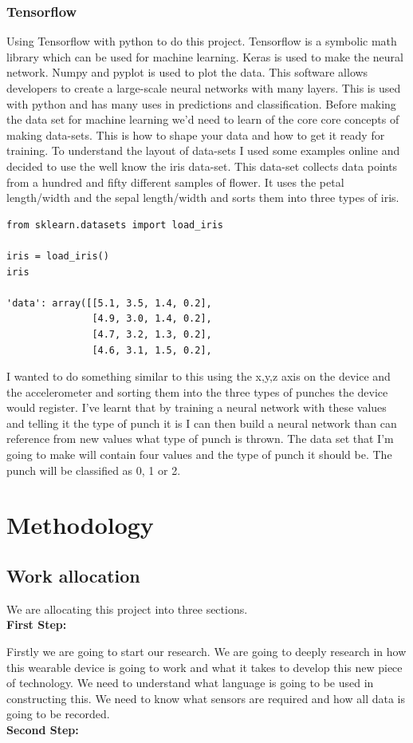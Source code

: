 \documentclass[a4paper,12pt,twoside]{report}
\begin{document}
\subsection{Tensorflow}
Using Tensorflow with python to do this project. Tensorflow is a symbolic math library which can be used for machine learning. Keras is used to make the neural network. Numpy and pyplot is used to plot the data. This software allows developers to create a large-scale neural networks with many layers. This is used with python and has many uses in predictions and classification. Before making the data set for machine learning we'd need to learn of the core core concepts of making data-sets. This is how to shape your data and how to get it ready for training. To understand the layout of data-sets I used some examples online and decided to use the well know the iris data-set. This data-set collects data points from a hundred and fifty different samples of flower. It uses the petal length/width and the sepal length/width and sorts them into three types of iris.
\begin{verbatim}
from sklearn.datasets import load_iris

iris = load_iris()
iris

'data': array([[5.1, 3.5, 1.4, 0.2],
               [4.9, 3.0, 1.4, 0.2],
               [4.7, 3.2, 1.3, 0.2],
               [4.6, 3.1, 1.5, 0.2],
\end{verbatim}
I wanted to do something similar to this using the x,y,z axis on the device and the accelerometer and sorting them into the three types of punches the device would register. I've learnt that by training a neural network with these values and telling it the type of punch it is I can then build a neural network than can reference from new values what type of punch is thrown. The data set that I'm going to make will contain four values and the type of punch it should be. The punch will be classified as 0, 1 or 2.

\chapter{Methodology}
\section{Work allocation}
We are allocating this project into three sections.\\
\textbf{First Step:}

Firstly we are going to start our research. We are going to deeply research in how this wearable device is going to work and what it takes to develop this new piece of technology. We need to understand what language is going to be used in constructing this. We need to know what sensors are required and how all data is going to be recorded.
\\
\textbf{Second Step:}
\end{document}
